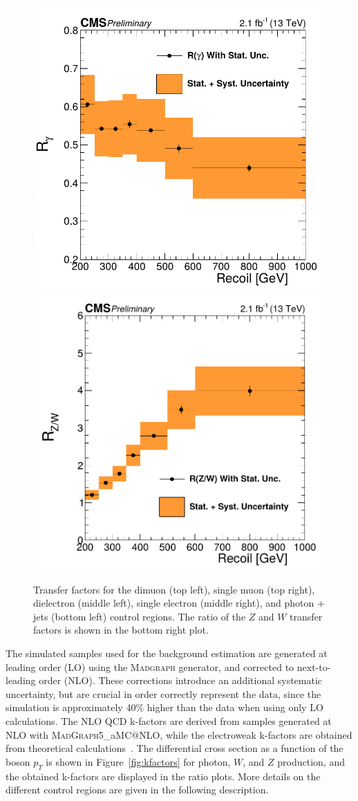 \begin{figure}[p]
 \vspace{.2cm}
 \includegraphics[width=.49\textwidth]{gamma_TF.png} 
 \includegraphics[width=.5\textwidth]{ZW_ratio.png} 
 \caption{Transfer factors for the dimuon (top left), single muon (top right), dielectron (middle left), single electron (middle right), and photon + jets (bottom left) control regions. The ratio of the $Z$ and $W$ transfer factors is shown in the bottom right plot.}
 \label{fig:TF}
\end{figure}

The simulated samples used for the background estimation are generated at leading order (LO) using the \textsc{Madgraph} generator, and corrected to next-to-leading order (NLO). These corrections introduce an additional systematic uncertainty, but are crucial in order correctly represent the data, since the simulation is approximately 40\% higher than the data when using only LO calculations. The NLO QCD k-factors are derived from samples generated at NLO with \textsc{MadGraph5\_}a\textsc{MC@NLO}, while the electroweak k-factors are obtained from theoretical calculations~\cite{Kuhn:2005gv, Kallweit:2015fta, Kallweit:2014xda, Kallweit:2015dum}. The differential cross section as a function of the boson $p_T$ is shown in Figure~\ref{fig:kfactors} for photon, $W$, and $Z$ production, and the obtained k-factors are displayed in the ratio plots. More details on the different control regions are given in the following description.

